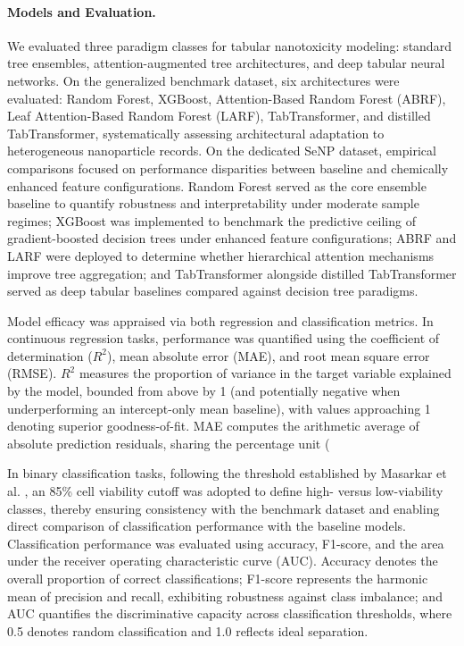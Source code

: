 \paragraph{Models and Evaluation.}
We evaluated three paradigm classes for tabular nanotoxicity modeling: standard tree ensembles, attention-augmented tree architectures, and deep tabular neural networks. On the generalized benchmark dataset, six architectures were evaluated: Random Forest, XGBoost, Attention-Based Random Forest (ABRF), Leaf Attention-Based Random Forest (LARF), TabTransformer, and distilled TabTransformer, systematically assessing architectural adaptation to heterogeneous nanoparticle records. On the dedicated SeNP dataset, empirical comparisons focused on performance disparities between baseline and chemically enhanced feature configurations. Random Forest served as the core ensemble baseline to quantify robustness and interpretability under moderate sample regimes; XGBoost was implemented to benchmark the predictive ceiling of gradient-boosted decision trees under enhanced feature configurations; ABRF and LARF were deployed to determine whether hierarchical attention mechanisms improve tree aggregation; and TabTransformer alongside distilled TabTransformer served as deep tabular baselines compared against decision tree paradigms.

Model efficacy was appraised via both regression and classification metrics. In continuous regression tasks, performance was quantified using the coefficient of determination ($R^2$), mean absolute error (MAE), and root mean square error (RMSE). $R^2$ measures the proportion of variance in the target variable explained by the model, bounded from above by 1 (and potentially negative when underperforming an intercept-only mean baseline), with values approaching 1 denoting superior goodness-of-fit. MAE computes the arithmetic average of absolute prediction residuals, sharing the percentage unit (%

In binary classification tasks, following the threshold established by Masarkar et al. \cite{masarkar2024}, an 85\% cell viability cutoff was adopted to define high- versus low-viability classes, thereby ensuring consistency with the benchmark dataset and enabling direct comparison of classification performance with the baseline models. Classification performance was evaluated using accuracy, F1-score, and the area under the receiver operating characteristic curve (AUC). Accuracy denotes the overall proportion of correct classifications; F1-score represents the harmonic mean of precision and recall, exhibiting robustness against class imbalance; and AUC quantifies the discriminative capacity across classification thresholds, where 0.5 denotes random classification and 1.0 reflects ideal separation.

